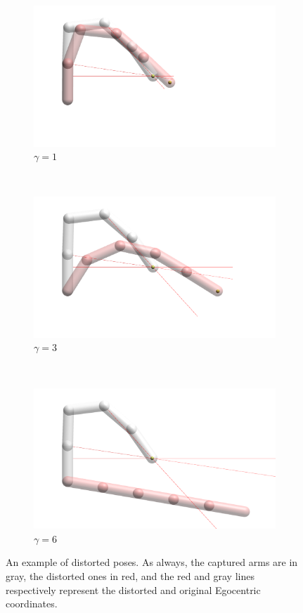 \begin{figure}[h]
    \begin{subfigure}[b]{.3\textwidth}
        \includegraphics[width=\textwidth]{Figures/distortions/distortions1.png}
        \caption{$\gamma = 1$}
    \end{subfigure}
    ~
    \begin{subfigure}[b]{.3\textwidth}
        \includegraphics[width=\textwidth]{Figures/distortions/distortions3.png}
        \caption{$\gamma = 3$}
    \end{subfigure}
    ~
    \begin{subfigure}[b]{.3\textwidth}
        \includegraphics[width=\textwidth]{Figures/distortions/distortions6.png}
        \caption{$\gamma = 6$}
    \end{subfigure}

    \caption{An example of distorted poses. As always, the captured arms are in gray, the distorted ones in red, and the red and gray lines respectively represent the distorted and original Egocentric coordinates.}
    \label{fig:distortionExamples}
\end{figure}


